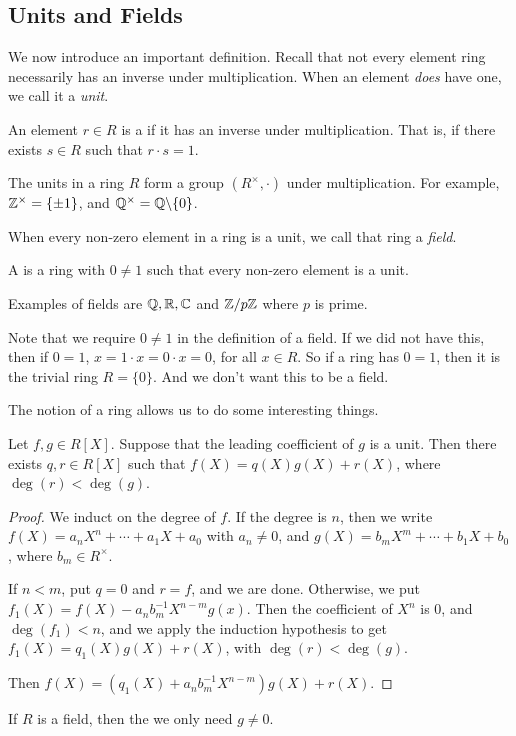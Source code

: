 \documentclass[a4paper]{scrartcl}
\begin{document}
\subsection{Units and Fields}

We now introduce an important definition. Recall that not every element ring necessarily has an inverse under multiplication. When an element \emph{does} have one, we call it a \emph{unit}.

\begin{definition}[Unit]
	An element $r \in R$ is a  if it has an inverse under multiplication. That is, if there exists $s \in R$ such that $r\cdot s = 1$.
\end{definition}

The units in a ring $R$ form a group $(R^\times, \cdot)$ under multiplication. For example, $\mathbb{Z}^\times = \{\pm 1\}$, and $\mathbb{Q}^\times = \mathbb{Q} \backslash \{0\}$.

When every non-zero element in a ring is a unit, we call that ring a \emph{field}.

\begin{definition}[Field]
	A  is a ring with $0 \neq 1$ such that every non-zero element is a unit.
\end{definition}

Examples of fields are $\mathbb{Q}, \mathbb{R}, \mathbb{C}$ and $\mathbb{Z}/p\mathbb{Z}$ where $p$ is prime.

\begin{remark}
	Note that we require $0 \neq 1$ in the definition of a field. If we did not have this, then if $0 = 1$, $x = 1 \cdot x = 0 \cdot x = 0$, for all $x \in R$. So if a ring has $0 = 1$, then it is the trivial ring $R = \{0\}$. And we don't want this to be a field.
\end{remark}

The notion of a ring allows us to do some interesting things.

\begin{lemma}
	Let $f, g \in R[X]$. Suppose that the leading coefficient of $g$ is a unit. Then there exists $q, r \in R[X]$ such that $f(X) = q(X) g(X) + r(X)$, where $\deg(r) < \deg(g)$.
\end{lemma}
\begin{proof}
	We induct on the degree of $f$. If the degree is $n$, then we write $f(X) = a_n X^n + \cdots + a_1 X + a_0$ with $a_n \neq 0$, and $g(X) = b_m X^m + \cdots + b_1  X + b_0$, where $b_m \in R^\times$.

	If $n < m$, put $q = 0$ and $r = f$, and we are done. Otherwise, we put $f_1(X) = f(X) - a_n b_m^{-1}X^{n - m}g(x)$. Then the coefficient of $X^n$ is $0$, and $\deg(f_1) < n$, and we apply the induction hypothesis to get $f_1(X) = q_1(X)g(X) + r(X)$, with $\deg(r) < \deg(g)$.

	Then $f(X) =(q_1(X) + a_n b_{m}^{-1} X^{n - m})g(X) + r(X)$.
\end{proof}

\begin{remark}
	If $R$ is a field, then the we only need $g \neq 0$.
\end{remark}
\end{document}
